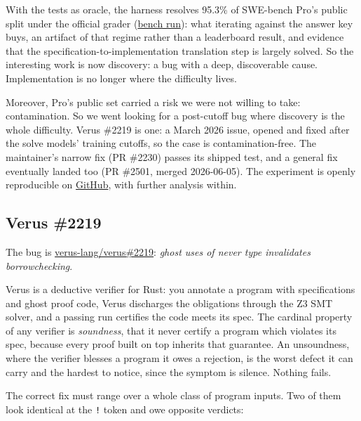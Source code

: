 \documentclass[
  10pt,
]{article}
\begin{document}
With the tests as oracle, the harness resolves 95.3\% of SWE-bench Pro's
public split under the official grader
(\href{https://anonymous.4open.science/r/wepro-3D87}{bench run}): what
iterating against the answer key buys, an artifact of that regime rather
than a leaderboard result, and evidence that the
specification-to-implementation translation step is largely solved. So
the interesting work is now discovery: a bug with a deep, discoverable
cause. Implementation is no longer where the difficulty lives.

Moreover, Pro's public set carried a risk we were not willing to take:
contamination. So we went looking for a post-cutoff bug where discovery
is the whole difficulty. Verus \#2219 is one: a March 2026 issue, opened
and fixed after the solve models' training cutoffs, so the case is
contamination-free. The maintainer's narrow fix (PR \#2230) passes its
shipped test, and a general fix eventually landed too (PR \#2501, merged
2026-06-05). The experiment is openly reproducible on
\href{https://anonymous.4open.science/r/hymech-117E}{GitHub}, with
further analysis within.

\subsection{Verus \#2219}\label{verus-fit}

The bug is
\href{https://github.com/verus-lang/verus/issues/2219}{verus-lang/verus\#2219}:
\emph{ghost uses of never type invalidates borrowchecking}.

Verus is a deductive verifier for Rust: you annotate a program with
specifications and ghost proof code, Verus discharges the obligations
through the Z3 SMT solver, and a passing run certifies the code meets
its spec. The cardinal property of any verifier is \emph{soundness},
that it never certify a program which violates its spec, because every
proof built on top inherits that guarantee. An unsoundness, where the
verifier blesses a program it owes a rejection, is the worst defect it
can carry and the hardest to notice, since the symptom is silence.
Nothing fails.

The correct fix must range over a whole class of program inputs. Two of
them look identical at the \texttt{!} token and owe opposite verdicts:
\end{document}
